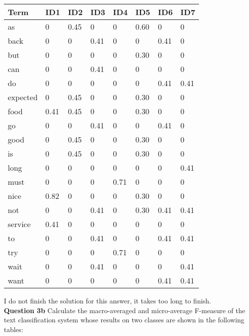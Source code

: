 \documentclass[11pt,a4paper]{report}
\begin{document}
\begin{multicols*}{2}
\scriptsize
\begin{center}
\begin{tabular}{| l | l l l l l l l |}
\hline
Term     & ID1  & ID2  & ID3  & ID4  & ID5  & ID6  & ID7 \\ \hline
as       & 0    & 0.45 & 0    & 0    & 0.60 & 0    & 0   \\
back     & 0    & 0    & 0.41 & 0    & 0    & 0.41 & 0   \\
but      & 0    & 0    & 0    & 0    & 0.30 & 0    & 0   \\
can      & 0    & 0    & 0.41 & 0    & 0    & 0    & 0   \\
do       & 0    & 0    & 0    & 0    & 0    & 0.41 & 0.41\\
expected & 0    & 0.45 & 0    & 0    & 0.30 & 0    & 0   \\
food     & 0.41 & 0.45 & 0    & 0    & 0.30 & 0    & 0   \\
go       & 0    & 0    & 0.41 & 0    & 0    & 0.41 & 0   \\
good     & 0    & 0.45 & 0    & 0    & 0.30 & 0    & 0   \\
is       & 0    & 0.45 & 0    & 0    & 0.30 & 0    & 0   \\
long     & 0    & 0    & 0    & 0    & 0    & 0    & 0.41\\
must     & 0    & 0    & 0    & 0.71 & 0    & 0    & 0   \\
nice     & 0.82 & 0    & 0    & 0    & 0.30 & 0    & 0   \\
not      & 0    & 0    & 0.41 & 0    & 0.30 & 0.41 & 0.41\\
service  & 0.41 & 0    & 0    & 0    & 0    & 0    & 0   \\
to       & 0    & 0    & 0.41 & 0    & 0    & 0.41 & 0.41\\
try      & 0    & 0    & 0    & 0.71 & 0    & 0    & 0   \\
wait     & 0    & 0    & 0.41 & 0    & 0    & 0    & 0.41\\
want     & 0    & 0    & 0    & 0    & 0    & 0.41 & 0.41\\ \hline
\end{tabular}
\end{center}
\normalsize

\noindent I do not finish the solution for this answer, it takes too long to finish. \\

\noindent \textbf{Question 3b} Calculate the macro-averaged and micro-average F-measure of the text classification system whose results on two classes are shown in the following tables:


\end{multicols*}
\end{document}
